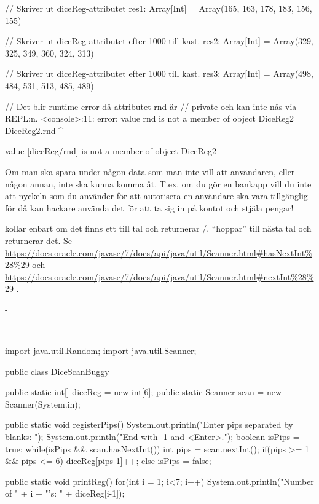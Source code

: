 {\begin{REPL}
  // Skriver ut diceReg-attributet
res1: Array[Int] = Array(165, 163, 178, 183, 156, 155)

  // Skriver ut diceReg-attributet efter 1000 till kast.
res2: Array[Int] = Array(329, 325, 349, 360, 324, 313)

  // Skriver ut diceReg-attributet efter 1000 till kast.
res3: Array[Int] = Array(498, 484, 531, 513, 485, 489)

  // Det blir runtime error då attributet rnd är 
  // private och kan inte nås via REPL:n.
<console>:11: error: value rnd is not a member of object DiceReg2
	DiceReg2.rnd
				    ^
\end{REPL}

\Subtask \begin{REPL}
value [diceReg/rnd] is not a member of object DiceReg2
\end{REPL}

\Subtask Om man ska spara under någon data som man inte vill att användaren, eller någon annan, inte ska kunna komma åt. 
T.ex. om du gör en bankapp vill du inte att nyckeln som du använder för att autorisera en användare ska vara tillgänglig för då kan hackare använda det för att ta sig in på kontot och stjäla pengar!


\Task %

\Subtask {} kollar enbart om det finns ett till tal och returnerar /.  “hoppar” till nästa tal och returnerar det.
Se \url{https://docs.oracle.com/javase/7/docs/api/java/util/Scanner.html#hasNextInt%28%29} och \url{https://docs.oracle.com/javase/7/docs/api/java/util/Scanner.html#nextInt%28%29 }.

\Subtask -

\Subtask -

\Subtask \begin{Code}[language=Java,numbers=left]
import java.util.Random;
import java.util.Scanner;

public class DiceScanBuggy {
	public static int[] diceReg = new int[6];
	public static Scanner scan = new Scanner(System.in);
	
	public static void registerPips() {
		System.out.println("Enter pips separated by blanks: ");
		System.out.println("End with -1 and <Enter>.");
		boolean isPips = true;
		while(isPips && scan.hasNextInt()){
			int pips = scan.nextInt();
			if(pips >= 1 && pips <= 6) {
				diceReg[pips-1]++;
			} else {
				isPips = false;
			}
		}
	}
  
	public static void printReg(){
		for(int i = 1; i<7; i++) {
		System.out.println("Number of " + i + "'s: " + diceReg[i-1]);
		}
	}
  
}
\end{Code}}
